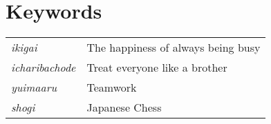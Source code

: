 \section*{Keywords}
\begin{tabular}{ l l }
    \textit{ikigai} & The happiness of always being busy \\ 
    \textit{icharibachode} & Treat everyone like a brother \\  
    \textit{yuimaaru} & Teamwork \\
    \textit{shogi} & Japanese Chess
\end{tabular}
